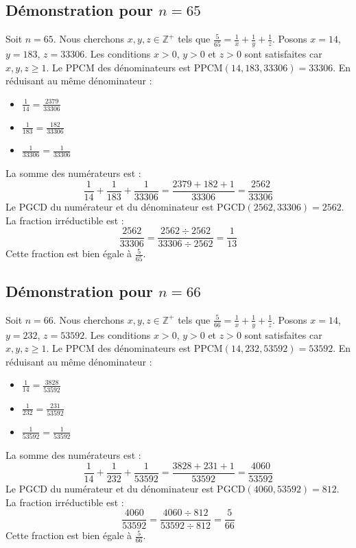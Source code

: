 \documentclass[11pt,a4paper]{article}
\begin{document}
\subsection{Démonstration pour $n = 65$}
Soit $n = 65$. Nous cherchons $x, y, z \in \mathbb{Z}^{+}$ tels que $\frac{5}{65} = \frac{1}{x} + \frac{1}{y} + \frac{1}{z}$.
Posons $x = 14$, $y = 183$, $z = 33306$.
Les conditions $x > 0$, $y > 0$ et $z > 0$ sont satisfaites car $x, y, z \geq 1$.
Le PPCM des dénominateurs est $\text{PPCM}(14, 183, 33306) = 33306$.
En réduisant au même dénominateur :
\begin{itemize}
    \item $\frac{1}{14} = \frac{2379}{33306}$
    \item $\frac{1}{183} = \frac{182}{33306}$
    \item $\frac{1}{33306} = \frac{1}{33306}$
\end{itemize}
La somme des numérateurs est :
$$ \frac{1}{14} + \frac{1}{183} + \frac{1}{33306} = \frac{2379 + 182 + 1}{33306} = \frac{2562}{33306} $$
Le PGCD du numérateur et du dénominateur est $\text{PGCD}(2562, 33306) = 2562$.
La fraction irréductible est :
$$ \frac{2562}{33306} = \frac{2562 \div 2562}{33306 \div 2562} = \frac{1}{13} $$
Cette fraction est bien égale à $\frac{5}{65}$.

\subsection{Démonstration pour $n = 66$}
Soit $n = 66$. Nous cherchons $x, y, z \in \mathbb{Z}^{+}$ tels que $\frac{5}{66} = \frac{1}{x} + \frac{1}{y} + \frac{1}{z}$.
Posons $x = 14$, $y = 232$, $z = 53592$.
Les conditions $x > 0$, $y > 0$ et $z > 0$ sont satisfaites car $x, y, z \geq 1$.
Le PPCM des dénominateurs est $\text{PPCM}(14, 232, 53592) = 53592$.
En réduisant au même dénominateur :
\begin{itemize}
    \item $\frac{1}{14} = \frac{3828}{53592}$
    \item $\frac{1}{232} = \frac{231}{53592}$
    \item $\frac{1}{53592} = \frac{1}{53592}$
\end{itemize}
La somme des numérateurs est :
$$ \frac{1}{14} + \frac{1}{232} + \frac{1}{53592} = \frac{3828 + 231 + 1}{53592} = \frac{4060}{53592} $$
Le PGCD du numérateur et du dénominateur est $\text{PGCD}(4060, 53592) = 812$.
La fraction irréductible est :
$$ \frac{4060}{53592} = \frac{4060 \div 812}{53592 \div 812} = \frac{5}{66} $$
Cette fraction est bien égale à $\frac{5}{66}$.
\end{document}
